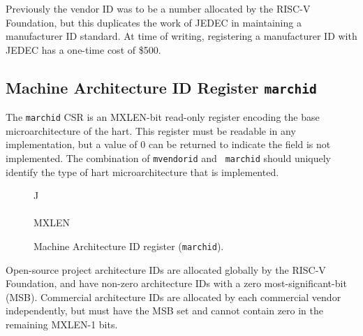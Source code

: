 \begin{commentary}
Previously the vendor ID was to be a number allocated by the RISC-V
Foundation, but this duplicates the work of JEDEC in maintaining a
manufacturer ID standard.  At time of writing, registering a
manufacturer ID with JEDEC has a one-time cost of \$500.
\end{commentary}

\subsection{Machine Architecture ID Register {\tt marchid}}

The {\tt marchid} CSR is an MXLEN-bit read-only register encoding the
base microarchitecture of the hart.  This register must be readable in
any implementation, but a value of 0 can be returned to indicate the
field is not implemented.  The combination of {\tt mvendorid} and {\tt
  marchid} should uniquely identify the type of hart microarchitecture
that is implemented.

\begin{figure*}[h!]
{\footnotesize
\begin{center}
\begin{tabular}{J}
 \\
\hline
{} \\
\hline
MXLEN \\
\end{tabular}
\end{center}
}
\vspace{-0.1in}
\caption{Machine Architecture ID register ({\tt marchid}).}
\label{marchreg}
\end{figure*}

Open-source project architecture IDs are allocated globally by the
RISC-V Foundation, and have non-zero architecture IDs with a zero
most-significant-bit (MSB).  Commercial architecture IDs are allocated
by each commercial vendor independently, but must have the MSB set and
cannot contain zero in the remaining MXLEN-1 bits.

